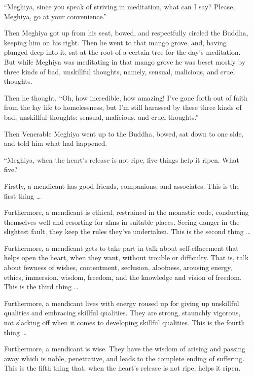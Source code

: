 \documentclass[12pt,openany]{book}%
\begin{document}
“Meghiya, since you speak of striving in meditation, what can I say? Please, Meghiya, go at your convenience.” 

Then Meghiya got up from his seat, bowed, and respectfully circled the Buddha, keeping him on his right. Then he went to that mango grove, and, having plunged deep into it, sat at the root of a certain tree for the day’s meditation. But while Meghiya was meditating in that mango grove he was beset mostly by three kinds of bad, unskillful thoughts, namely, sensual, malicious, and cruel thoughts. 

Then he thought, “Oh, how incredible, how amazing! I’ve gone forth out of faith from the lay life to homelessness, but I’m still harassed by these three kinds of bad, unskillful thoughts: sensual, malicious, and cruel thoughts.” 

Then Venerable Meghiya went up to the Buddha, bowed, sat down to one side, and told him what had happened. 

“Meghiya, when the heart’s release is not ripe, five things help it ripen. What five? 

Firstly, a mendicant has good friends, companions, and associates. This is the first thing … 

Furthermore, a mendicant is ethical, restrained in the monastic code, conducting themselves well and resorting for alms in suitable places. Seeing danger in the slightest fault, they keep the rules they’ve undertaken. This is the second thing … 

Furthermore, a mendicant gets to take part in talk about self-effacement that helps open the heart, when they want, without trouble or difficulty. That is, talk about fewness of wishes, contentment, seclusion, aloofness, arousing energy, ethics, immersion, wisdom, freedom, and the knowledge and vision of freedom. This is the third thing … 

Furthermore, a mendicant lives with energy roused up for giving up unskillful qualities and embracing skillful qualities. They are strong, staunchly vigorous, not slacking off when it comes to developing skillful qualities. This is the fourth thing … 

Furthermore, a mendicant is wise. They have the wisdom of arising and passing away which is noble, penetrative, and leads to the complete ending of suffering. This is the fifth thing that, when the heart’s release is not ripe, helps it ripen. 
\end{document}
